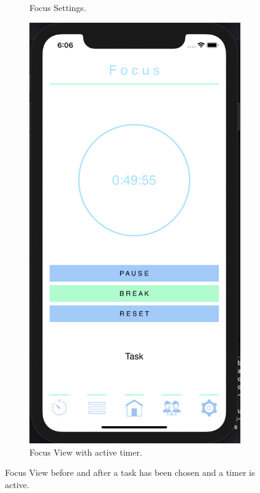 \begin{figure}[H]
\begin{subfigure}[b]{0.3\textwidth}
        \caption{Focus Settings.}
        \label{fig:focus_settings_app}
    \end{subfigure}
    \hfill
    \begin{subfigure}[b]{0.3\textwidth}
        \centering
        \includegraphics[width=\textwidth]{./graphics/Implementation/Focus/focus set.png}
        \caption{Focus View with active timer.}
        \label{fig:focus_set_app}
    \end{subfigure}
    
    \caption{Focus View before and after a task has been chosen and a timer is active.}
    \label{fig:focus_app}
\end{figure}
